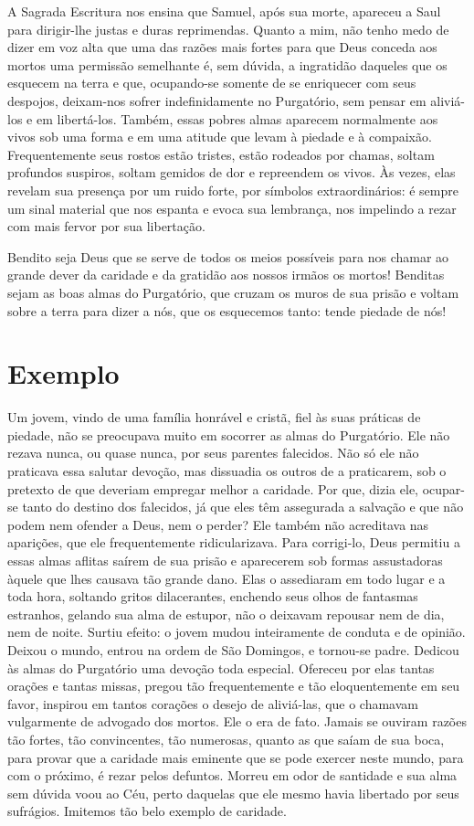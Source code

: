 A Sagrada Escritura nos ensina que Samuel, após sua morte, apareceu a Saul para dirigir-lhe justas e duras reprimendas. Quanto a mim, não tenho medo de dizer em voz alta que uma das razões mais fortes para que Deus conceda aos mortos uma permissão semelhante é, sem dúvida, a ingratidão daqueles que os esquecem na terra e que, ocupando-se somente de se enriquecer com seus despojos, deixam-nos sofrer indefinidamente no Purgatório, sem pensar em aliviá-los e em libertá-los. Também, essas pobres almas aparecem normalmente aos vivos sob uma forma e em uma atitude que levam à piedade e à compaixão. Frequentemente seus rostos estão tristes, estão rodeados por chamas, soltam profundos suspiros, soltam gemidos de dor e repreendem os vivos. Às vezes, elas revelam sua presença por um ruido forte, por símbolos extraordinários: é sempre um sinal material que nos espanta e evoca sua lembrança, nos impelindo a rezar com mais fervor por sua libertação. 

Bendito seja Deus que se serve de todos os meios possíveis para nos chamar ao grande dever da caridade e da gratidão aos nossos irmãos os mortos! Benditas sejam as boas almas do Purgatório, que cruzam os muros de sua prisão e voltam sobre a terra para dizer a nós, que os esquecemos tanto: tende piedade de nós!


\section*{Exemplo }

Um jovem, vindo de uma família honrável e cristã, fiel às suas práticas de piedade, não se preocupava muito em socorrer as almas do Purgatório. Ele não rezava nunca, ou quase nunca, por seus parentes falecidos. Não só ele não praticava essa salutar devoção, mas dissuadia os outros de a praticarem, sob o pretexto de que deveriam empregar melhor a caridade. Por que, dizia ele, ocupar-se tanto do destino dos falecidos, já que eles têm assegurada a salvação e que não podem nem ofender a Deus, nem o perder? Ele também não acreditava nas aparições, que ele frequentemente ridicularizava. Para corrigi-lo, Deus permitiu a essas almas aflitas saírem de sua prisão e aparecerem sob formas assustadoras àquele que lhes causava tão grande dano. Elas o assediaram em todo lugar e a toda hora, soltando gritos dilacerantes, enchendo seus olhos de fantasmas estranhos, gelando sua alma de estupor, não o deixavam repousar nem de dia, nem de noite. Surtiu efeito: o jovem mudou inteiramente de conduta e de opinião. Deixou o mundo, entrou na ordem de São Domingos, e tornou-se padre. Dedicou às almas do Purgatório uma devoção toda especial. Ofereceu por elas tantas orações e tantas missas, pregou tão frequentemente e tão eloquentemente em seu favor, inspirou em tantos corações o desejo de aliviá-las, que o chamavam vulgarmente de advogado dos mortos. Ele o era de fato. Jamais se ouviram razões tão fortes, tão convincentes, tão numerosas, quanto as que saíam de sua boca, para provar que a caridade mais eminente que se pode exercer neste mundo, para com o próximo, é rezar pelos defuntos. Morreu em odor de santidade e sua alma sem dúvida voou ao Céu, perto daquelas que ele mesmo havia libertado por seus sufrágios. Imitemos tão belo exemplo de caridade.


